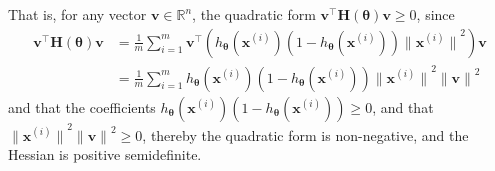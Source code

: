 That is, for any vector \( \mathbf{v} \in \mathbb{R}^n \), the quadratic form \( \mathbf{v}^\top \mathbf{H}(\boldsymbol{\theta}) \mathbf{v} \geq 0 \), since
\begin{align*}
    \mathbf{v}^\top \mathbf{H}(\boldsymbol{\theta}) \mathbf{v}
     & =
    \frac{1}{m} \sum_{i=1}^{m}
    \mathbf{v}^\top
    \left(
    h_{\boldsymbol{\theta}}\left(\mathbf{x}^{(i)}\right) \left(1-h_{\boldsymbol{\theta}}\left(\mathbf{x}^{(i)}\right)\right)
    {{\lVert \mathbf{x}^{(i)} \rVert}^2}
    \right)
    \mathbf{v}
    \\ & =
    \frac{1}{m} \sum_{i=1}^{m}
    h_{\boldsymbol{\theta}}\left(\mathbf{x}^{(i)}\right) \left(1-h_{\boldsymbol{\theta}}\left(\mathbf{x}^{(i)}\right)\right)
    {{\lVert \mathbf{x}^{(i)} \rVert}^2}
    {{\lVert \mathbf{v} \rVert}^2}
\end{align*}
and that the coefficients \( h_{\boldsymbol{\theta}}\left(\mathbf{x}^{(i)}\right) \left(1-h_{\boldsymbol{\theta}}\left(\mathbf{x}^{(i)}\right)\right) \geq 0 \), and that \( {{\lVert \mathbf{x}^{(i)} \rVert}^2}{{\lVert \mathbf{v} \rVert}^2} \geq 0 \), thereby the quadratic form is non-negative, and the Hessian is positive semidefinite.
